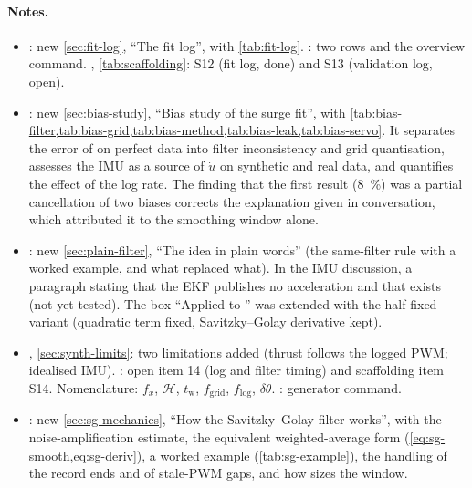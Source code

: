 \paragraph{Notes.}
\begin{itemize}
  \item {}: new \cref{sec:fit-log}, ``The fit log'', with \cref{tab:fit-log}.
        : two rows and the overview command. ,
        \cref{tab:scaffolding}: S12 (fit log, done) and S13 (validation log, open).
  \item {}: new \cref{sec:bias-study}, ``Bias study of the surge fit'', with
        \cref{tab:bias-filter,tab:bias-grid,tab:bias-method,tab:bias-leak,tab:bias-servo}. It
        separates the error of  on perfect data into filter inconsistency
        and grid quantisation, assesses the IMU as a source of $\dot u$ on synthetic and real
        data, and quantifies the effect of the  log rate. The finding
        that the first result (\qty{8}{\percent}) was a partial cancellation of two biases
        corrects the explanation given in conversation, which attributed it to the smoothing
        window alone.
  \item {}: new \cref{sec:plain-filter}, ``The idea in plain words'' (the
        same-filter rule with a worked example, and what replaced what). In the IMU discussion, a
        paragraph stating that the EKF publishes no acceleration and that
         exists (not yet tested). The box ``Applied to
        '' was extended with the half-fixed variant (quadratic term fixed,
        Savitzky--Golay derivative kept).
  \item {}, \cref{sec:synth-limits}: two limitations added (thrust follows the
        logged PWM; idealised IMU). : open item 14 (log and filter timing) and
        scaffolding item S14. Nomenclature: $f_x$, $\mathcal{H}$, $t_\mathrm{w}$,
        $f_\mathrm{grid}$, $f_\mathrm{log}$, $\delta\theta$. : generator command.
  \item {}: new \cref{sec:sg-mechanics}, ``How the Savitzky--Golay filter
        works'', with the noise-amplification estimate, the equivalent weighted-average form
        (\cref{eq:sg-smooth,eq:sg-deriv}), a worked example (\cref{tab:sg-example}), the handling
        of the record ends and of stale-PWM gaps, and how  sizes the window.
\end{itemize}

